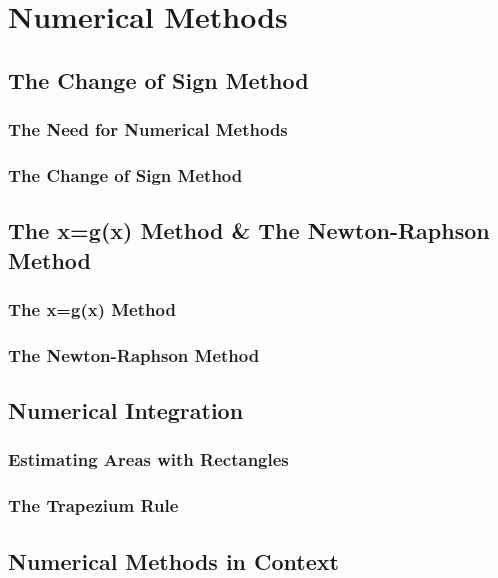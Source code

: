 \documentclass[../alevelmaths.tex]{subfiles}
\begin{document}
\chapter{Numerical Methods}
\section{The Change of Sign Method}
\subsection*{The Need for Numerical Methods}
\subsection*{The Change of Sign Method}
\section{The x=g(x) Method \& The Newton-Raphson Method}
\subsection*{The x=g(x) Method}
\subsection*{The Newton-Raphson Method}
\section{Numerical Integration}
\subsection*{Estimating Areas with Rectangles}
\subsection*{The Trapezium Rule}
\section{Numerical Methods in Context}
\end{document}
